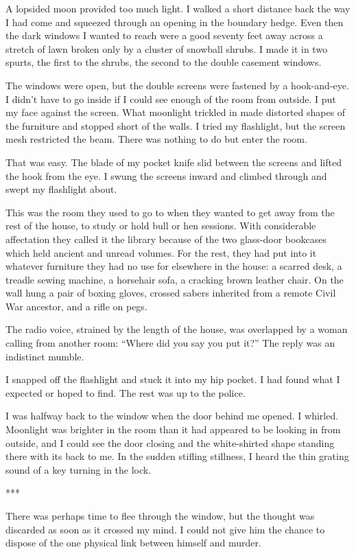 \documentclass{novel}
\begin{document}
A lopsided moon provided too much light. I walked a short distance back the way I had come and squeezed through an opening in the boundary hedge. Even then the dark windows I wanted to reach were a good seventy feet away across a stretch of lawn broken only by a cluster of snowball shrubs. I made it in two spurts, the first to the shrubs, the second to the double casement windows.

The windows were open, but the double screens were fastened by a hook-and-eye. I didn’t have to go inside if I could see enough of the room from outside. I put my face against the screen. What moonlight trickled in made distorted shapes of the furniture and stopped short of the walls. I tried my flashlight, but the screen mesh restricted the beam. There was nothing to do but enter the room.

That was easy. The blade of my pocket knife slid between the screens and lifted the hook from the eye. I swung the screens inward and climbed through and swept my flashlight about.

This was the room they used to go to when they wanted to get away from the rest of the house, to study or hold bull or hen sessions. With considerable affectation they called it the library because of the two glass-door bookcases which held ancient and unread volumes. For the rest, they had put into it whatever furniture they had no use for elsewhere in the house: a scarred desk, a treadle sewing machine, a horsehair sofa, a cracking brown leather chair. On the wall hung a pair of boxing gloves, crossed sabers inherited from a remote Civil War ancestor, and a rifle on pegs.

The radio voice, strained by the length of the house, was overlapped by a woman calling from another room: “Where did you say you put it?” The reply was an indistinct mumble.

I snapped off the flashlight and stuck it into my hip pocket. I had found what I expected or hoped to find. The rest was up to the police.

I was halfway back to the window when the door behind me opened. I whirled. Moonlight was brighter in the room than it had appeared to be looking in from outside, and I could see the door closing and the white-shirted shape standing there with its back to me. In the sudden stifling stillness, I heard the thin grating sound of a key turning in the lock.

***

There was perhaps time to flee through the window, but the thought was discarded as soon as it crossed my mind. I could not give him the chance to dispose of the one physical link between himself and murder.
\end{document}
